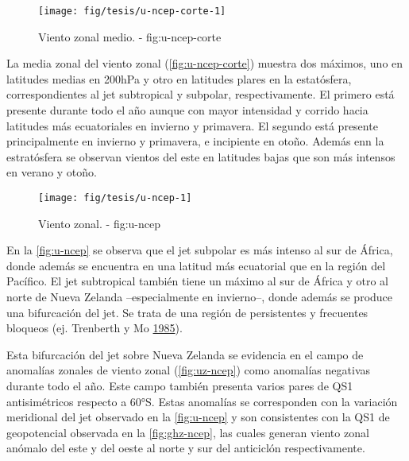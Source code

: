 \documentclass[spanish,a4paper]{book}
\begin{document}
\begin{figure}

{\centering \texttt{[image: fig/tesis/u-ncep-corte-1]} 

}

\caption{Viento zonal medio. - fig:u-ncep-corte}\label{fig:u-ncep-corte}
\end{figure}

La media zonal del viento zonal (\autoref{fig:u-ncep-corte}) muestra dos
máximos, uno en latitudes medias en 200hPa y otro en latitudes plares en
la estatósfera, correspondientes al jet subtropical y subpolar,
respectivamente. El primero está presente durante todo el año aunque con
mayor intensidad y corrido hacia latitudes más ecuatoriales en invierno
y primavera. El segundo está presente principalmente en invierno y
primavera, e incipiente en otoño. Además enn la estratósfera se observan
vientos del este en latitudes bajas que son más intensos en verano y
otoño.

\begin{landscape}\begin{figure}

{\centering \texttt{[image: fig/tesis/u-ncep-1]} 

}

\caption{Viento zonal. - fig:u-ncep}\label{fig:u-ncep}
\end{figure}
\end{landscape}

En la \autoref{fig:u-ncep} se observa que el jet subpolar es más intenso
al sur de África, donde además se encuentra en una latitud más
ecuatorial que en la región del Pacífico. El jet subtropical también
tiene un máximo al sur de África y otro al norte de Nueva Zelanda
--especialmente en invierno--, donde además se produce una bifurcación
del jet. Se trata de una región de persistentes y frecuentes bloqueos
(ej. Trenberth y Mo \protect\hyperlink{ref-Trenberth1985}{1985}).

Esta bifurcación del jet sobre Nueva Zelanda se evidencia en el campo de
anomalías zonales de viento zonal (\autoref{fig:uz-ncep}) como anomalías
negativas durante todo el año. Este campo también presenta varios pares
de QS1 antisimétricos respecto a 60°S. Estas anomalías se corresponden
con la variación meridional del jet observado en la \autoref{fig:u-ncep}
y son consistentes con la QS1 de geopotencial observada en la
\autoref{fig:ghz-ncep}, las cuales generan viento zonal anómalo del este
y del oeste al norte y sur del anticiclón respectivamente.
\end{document}
